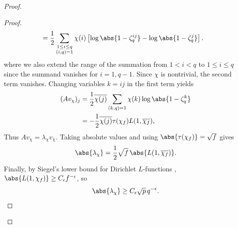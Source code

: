 \documentclass{article}
\begin{document}
\begin{proof}
\begin{proof}
\begin{align*}
&=
\frac{1}{2}
\sum_{\substack{1 \leq i \leq q \\ (i,q) = 1}}
\chi(i)
\left[
\log\abs{1-\zeta_q^{ij}} - \log\abs{1-\zeta_q^j}
\right].
\end{align*}
where we also extend the range of the summation from $1 < i < q$ to $1 \leq i \leq q$ since the summand vanishes for $i = 1, q-1$. Since $\chi$ is nontrivial, the second term vanishes. Changing variables $k=ij$ in the first term yields
\begin{align*}
(A v_\chi)_j
&=
\frac{1}{2}
\overline{\chi(j)}
    \sum_{(k,q)=1}
    \chi(k)\log\abs{1-\zeta_q^k}
\\
&=
-\frac{1}{2}
\overline{\chi(j)}
\tau(\chi_f)L(1,\overline{\chi_f}),
\end{align*}
Thus $A v_\chi = \lambda_\chi v_{\overline{\chi}}$. Taking absolute values and using $\abs{\tau(\chi_f)}=\sqrt{f}$ gives
\[
\abs{\lambda_\chi}
=
\frac{1}{2}\sqrt{f}\,\abs{L(1,\overline{\chi_f})}.
\]
Finally, by Siegel's lower bound for Dirichlet $L$-functions \cite[Ch.~21]{Davenport2000}, $\abs{L(1,\chi_f)} \ge C_\epsilon f^{-\epsilon}$, so
\[
\abs{\lambda_\chi} \ge C_\epsilon \sqrt{p}\, q^{-\epsilon}.
\]
\end{proof}



\end{proof}
\end{document}
